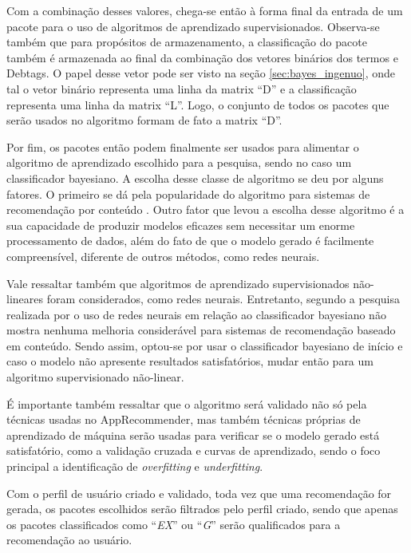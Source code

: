Com a combinação desses valores, chega-se então à forma final da entrada de um pacote para o uso de algoritmos de aprendizado
supervisionados. Observa-se também que para propósitos de armazenamento, a classificação do pacote também é armazenada ao final da combinação
dos vetores binários dos termos e Debtags. O papel desse vetor pode ser visto na
seção \ref{sec:bayes_ingenuo}, onde tal o vetor binário representa uma linha da
matrix ``D'' e a classificação representa uma linha da matrix ``L''. Logo, o
conjunto de todos os pacotes que serão usados no algoritmo formam de fato a
matrix ``D''.

Por fim, os pacotes então podem finalmente ser usados para alimentar o algoritmo de aprendizado escolhido para a pesquisa, sendo no caso um
classificador bayesiano. A escolha desse classe de algoritmo se deu por alguns fatores. O primeiro se dá pela popularidade do algoritmo para
sistemas de recomendação por conteúdo \cite{amatriain2011data}. Outro fator que levou a escolha desse algoritmo é a sua capacidade de produzir
modelos eficazes sem necessitar um enorme processamento de dados, além do fato
de que o modelo gerado é facilmente compreensível, diferente de outros métodos,
como redes neurais\cite{segaran2007programming}.

Vale ressaltar também que algoritmos de aprendizado supervisionados não-lineares foram considerados, como redes neurais. Entretanto, segundo
a pesquisa realizada por \cite{pazzani1997learning} o uso de redes neurais em relação ao classificador bayesiano não mostra nenhuma melhoria
considerável para sistemas de recomendação baseado em conteúdo. Sendo assim, optou-se por usar o
classificador bayesiano de início e caso o modelo não apresente
resultados satisfatórios, mudar então para um algoritmo supervisionado não-linear.

É importante também ressaltar que o algoritmo será validado não só pela técnicas usadas no AppRecommender, mas também técnicas próprias de
aprendizado de máquina serão usadas para verificar se o modelo gerado está
satisfatório, como a validação cruzada e curvas de aprendizado, sendo o foco principal a
identificação de \textit{overfitting} e \textit{underfitting}.

Com o perfil de usuário criado e validado, toda vez que uma recomendação for gerada, os pacotes escolhidos serão filtrados pelo perfil criado,
sendo que apenas os pacotes classificados como ``\textit{EX}'' ou ``\textit{G}'' serão qualificados para a recomendação ao usuário.

